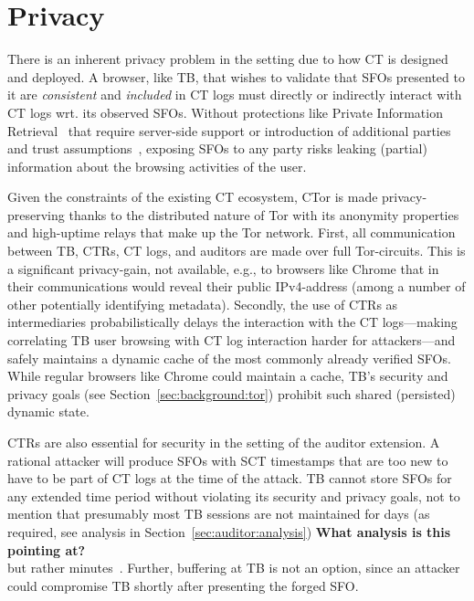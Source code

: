 \section{Privacy} \label{sec:privacy}
There is an inherent privacy problem in the setting due to how CT is designed
and deployed. A browser, like TB, that wishes to validate that SFOs presented to
it are \emph{consistent} and \emph{included} in CT logs must directly or
indirectly interact with CT logs wrt. its observed SFOs. Without protections
like Private Information Retrieval~\cite{PIR} that require server-side support
or introduction of additional parties and trust
assumptions~\cite{lueks-and-goldberg,kales}, exposing SFOs to any party risks
leaking (partial) information about the browsing activities of the user.

Given the constraints of the existing CT ecosystem, CTor is made
privacy-preserving thanks to the distributed nature of Tor with its anonymity
properties and high-uptime relays that make up the Tor network. First, all
communication between TB, CTRs, CT logs, and auditors are made over full
Tor-circuits. This is a significant privacy-gain, not available, e.g., to
browsers like Chrome that in their communications would reveal their public
IPv4-address (among a number of other potentially identifying metadata).
Secondly, the use of CTRs as intermediaries probabilistically delays the
interaction with the CT logs---making correlating TB user browsing with CT log
interaction harder for attackers---and safely maintains a dynamic cache of the
most commonly already verified SFOs. While regular browsers like Chrome could
maintain a cache, TB's security and privacy goals (see
Section~\ref{sec:background:tor}) prohibit such shared (persisted) dynamic
state.

CTRs are also essential for security in the setting of the auditor extension. A
rational attacker will produce SFOs with SCT timestamps that are too new to have
to be part of CT logs at the time of the attack. TB cannot store SFOs for any
extended time period without violating its security and privacy goals, not to
mention that presumably most TB sessions are not maintained for
days (as required, see analysis in Section~\ref{sec:auditor:analysis}) 
{\bf \color{red} What analysis is this pointing at?}\\
but rather minutes~\cite{DBLP:conf/pam/AmannS16}. Further, buffering
at TB is not an option, since an attacker could compromise TB shortly
after presenting the forged SFO.

